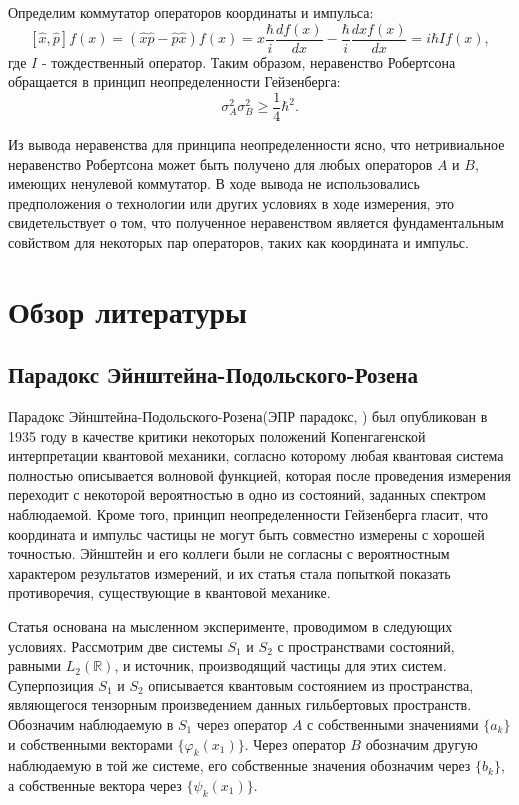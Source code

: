 \documentclass[%
master,         %
subf,           %
href,           %
colorlinks=true %
]{disser}
\numberwithin{equation}{section}
\numberwithin{figure}{section}
\begin{document}
Определим коммутатор операторов координаты и импульса:
\[
[\hat{x}, \hat{p}]f(x) = (\hat{x}\hat{p} - \hat{p}\hat{x})f(x) = x\frac{\hbar}{i}\frac{df(x)}{dx} - \frac{\hbar}{i}\frac{d xf(x)}{dx} = i\hbar If(x),
\]
где $I$ - тождественный оператор. Таким образом, неравенство Робертсона обращается в принцип неопределенности Гейзенберга:
\[
\sigma_A^2\sigma_B^2 \geq \frac{1}{4}\hbar^2.
\]

Из вывода неравенства для принципа неопределенности ясно, что нетривиальное неравенство Робертсона может быть получено для любых операторов $A$ и $B$, имеющих ненулевой коммутатор. В ходе вывода не использовались предположения о технологии или других условиях в ходе измерения, это свидетельствует о том, что полученное неравенством является фундаментальным совйством для некоторых пар операторов, таких как координата и импульс.

\chapter{Обзор литературы}

\section{Парадокс Эйнштейна-Подольского-Розена}
Парадокс Эйнштейна-Подольского-Розена(ЭПР парадокс, \cite{EPR}) был опубликован в 1935 году в качестве критики некоторых положений Копенгагенской интерпретации квантовой механики, согласно которому любая квантовая система полностью описывается волновой функцией, которая после проведения измерения переходит с некоторой вероятностью в одно из состояний, заданных спектром наблюдаемой. Кроме того, принцип неопределенности Гейзенберга гласит, что координата и импульс частицы не могут быть совместно измерены с хорошей точностью. Эйнштейн и его коллеги были не согласны с вероятностным характером результатов измерений, и их статья стала попыткой показать противоречия, существующие в квантовой механике.

Статья \cite{EPR} основана на мысленном эксперименте, проводимом в следующих условиях. Рассмотрим две системы $S_1$ и $S_2$ с пространствами состояний, равными $L_2(\mathbb{R})$, и источник, производящий частицы для этих систем.  Суперпозиция  $S_1$ и $S_2$ описывается квантовым состоянием из пространства, являющегося тензорным произведением данных гильбертовых пространств.  
Обозначим наблюдаемую в $S_1$ через оператор $A$ с собственными значениями $\{a_k\}$ и собственными векторами $\{\varphi_k(x_1)\}$. Через оператор $B$ обозначим другую наблюдаемую в той же системе, его собственные значения обозначим через $\{b_k\}$, а собственные вектора через $\{\psi_k(x_1)\}$. 
\end{document}
